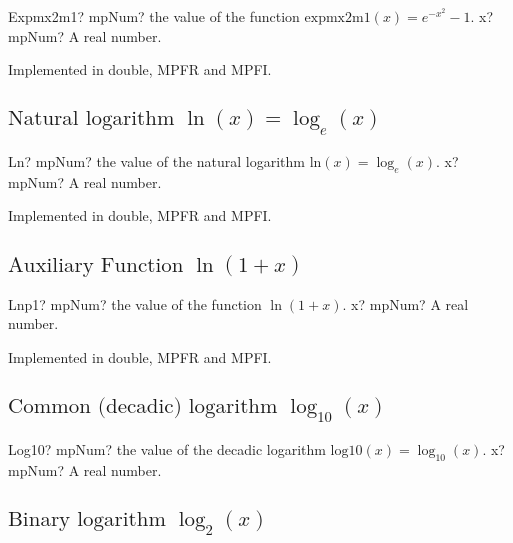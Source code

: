 \begin{mpFunctionsExtract}
	\mpFunctionOne
	{Expmx2m1? mpNum? the value of the function $\text{expmx2m1}(x) = e^{-x^2}-1$.}
	{x? mpNum? A real number.}
\end{mpFunctionsExtract}



Implemented in double, MPFR and MPFI.



\subsection{\texorpdfstring{$\text{Natural logarithm  }\ln(x) = \log_e(x)$}{ln}}

\begin{mpFunctionsExtract}
	\mpFunctionOne
	{Ln? mpNum? the value of the natural logarithm $\text{ln}(x) = \log_e(x)$.}
	{x? mpNum? A real number.}
\end{mpFunctionsExtract}


Implemented in double, MPFR and MPFI.


\subsection{\texorpdfstring{$\text{Auxiliary Function }\ln(1+x)$}{lnp1}}

\begin{mpFunctionsExtract}
	\mpFunctionOne
	{Lnp1? mpNum? the value of the function $\ln(1+x)$.}
	{x? mpNum? A real number.}
\end{mpFunctionsExtract}



Implemented in double, MPFR and MPFI.


\subsection{\texorpdfstring{$\text{Common (decadic) logarithm }\log_{10}(x)$}{log10}}

\begin{mpFunctionsExtract}
	\mpFunctionOne
	{Log10? mpNum? the value of the decadic logarithm $\text{log10}(x) = \log_{10}(x)$.}
	{x? mpNum? A real number.}
\end{mpFunctionsExtract}




\subsection{\texorpdfstring{$\text{Binary logarithm }\log_2(x)$}{log22}}

